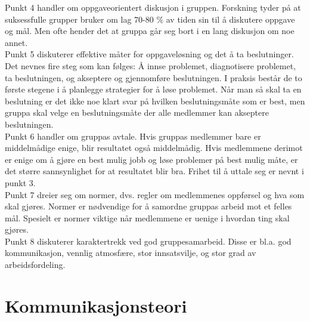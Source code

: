
Punkt 4 handler om oppgaveorientert diskusjon i gruppen. Forskning tyder på at suksessfulle grupper bruker om lag 70-80 \% av tiden sin til å diskutere oppgave og mål. Men ofte hender det at gruppa går seg bort i en lang diskusjon om noe annet. \\

Punkt 5 diskuterer effektive måter for oppgaveløsning og det å ta beslutninger. Det nevnes fire steg som kan følges: Å innse problemet, diagnotisere problemet, ta beslutningen, og akseptere og gjennomføre beslutningen. I praksis består de to første stegene i å planlegge strategier for å løse problemet. Når man så skal ta en beslutning er det ikke noe klart svar på hvilken beslutningsmåte som er best, men gruppa skal velge en beslutningsmåte der alle medlemmer kan akseptere beslutningen.  \\

Punkt 6 handler om gruppas avtale. Hvis gruppas medlemmer bare er middelmådige enige, blir resultatet også middelmådig. Hvis medlemmene derimot er enige om å gjøre en best mulig jobb og løse problemer på best mulig måte, er det større sannsynlighet for at resultatet blir bra. Frihet til å uttale seg er nevnt i punkt 3. \\

Punkt 7 dreier seg om normer, dvs. regler om medlemmenes oppførsel og hva som skal gjøres. Normer er nødvendige for å samordne gruppas arbeid mot et felles mål. Spesielt er normer viktige når medlemmene er uenige i hvordan ting skal gjøres. \\

Punkt 8 diskuterer karaktertrekk ved god gruppesamarbeid. Disse er bl.a. god kommunikasjon, vennlig atmosfære, stor innsatsvilje, og stor grad av arbeidsfordeling.\\

\section{Kommunikasjonsteori}

%

